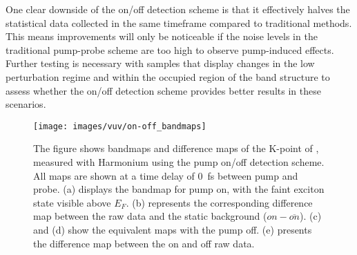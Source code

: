 One clear downside of the on/off detection scheme is that it effectively halves the statistical data collected in the same timeframe compared to traditional methods.
This means improvements will only be noticeable if the noise levels in the traditional pump-probe scheme are too high to observe pump-induced effects.
Further testing is necessary with samples that display changes in the low perturbation regime and within the occupied region of the band structure to assess whether the on/off detection scheme provides better results in these scenarios.

\begin{figure}
	\centering
	\texttt{[image: images/vuv/on-off\_bandmaps]}
	\caption{The figure shows bandmaps and difference maps of the K-point of , measured with Harmonium using the pump on/off detection scheme. All maps are shown at a time delay of \qty{0}{\femto\second} between pump and probe. (a) displays the bandmap for pump on, with the faint exciton state visible above $E_F$. (b) represents the corresponding difference map between the raw data and the static background ($on-\overline{on}$). (c) and (d) show the equivalent maps with the pump off. (e) presents the difference map between the on and off raw data.}
	\label{fig:on-offbandmaps}
\end{figure}
